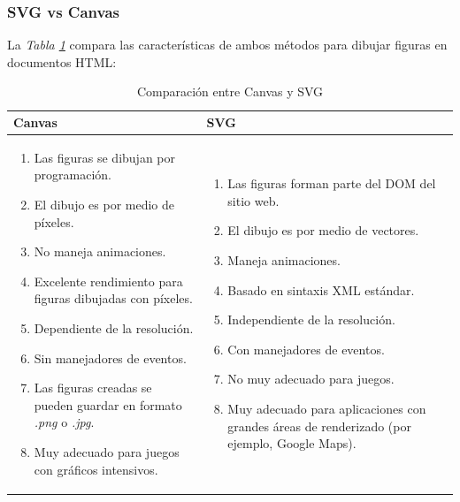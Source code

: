 \subsubsection{SVG vs Canvas}
\hspace{0.55cm}La \textit{Tabla \ref{tab: 1}} compara las características de ambos métodos para dibujar figuras en documentos HTML:
\begin{table}[H]
    \begin{center}
        \caption{Comparación entre Canvas y SVG}
        \label{tab: 1}
        \begin{tabular}{m{7cm} m{7cm}}
            \hline
            \textbf{Canvas} & \textbf{SVG} \\
            \hline
            \begin{enumerate}
                \item Las figuras se dibujan por programación.
                \item El dibujo es por medio de píxeles.
                \item No maneja animaciones.
                \item Excelente rendimiento para figuras dibujadas con píxeles.
                \item Dependiente de la resolución.
                \item Sin manejadores de eventos.
                \item Las figuras creadas se pueden guardar en formato \textit{.png} o \textit{.jpg}.
                \item Muy adecuado para juegos con gráficos intensivos.
            \end{enumerate}
            &
            \begin{enumerate}
                \item Las figuras forman parte del DOM del sitio web.
                \item El dibujo es por medio de vectores.
                \item Maneja animaciones.
                \item Basado en sintaxis XML estándar.
                \item Independiente de la resolución.
                \item Con manejadores de eventos.
                \item No muy adecuado para juegos.
                \item Muy adecuado para aplicaciones con grandes áreas de renderizado (por ejemplo, Google Maps).
            \end{enumerate}
            \\
            \hline
        \end{tabular}
    \end{center}
\end{table}

